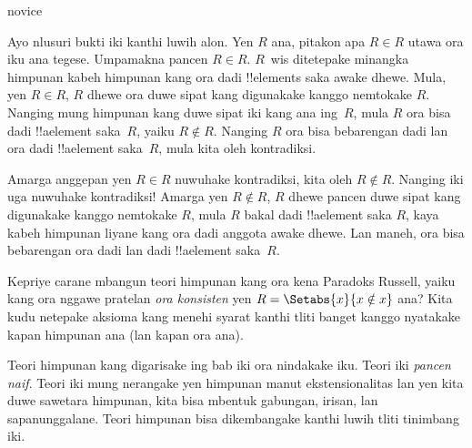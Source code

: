 \documentclass[../../../include/open-logic-section]{subfiles}
\begin{document}
\begin{tagblock}{novice}
\begin{explain}
Ayo nlusuri bukti iki kanthi luwih alon. Yen $R$ ana,
pitakon apa $R \in R$ utawa ora iku ana tegese.
Umpamakna pancen $R \in R$. $R$~wis ditetepake minangka
himpunan kabeh himpunan kang ora dadi !!{element}s saka
awake dhewe. Mula, yen $R \in R$, $R$ dhewe ora duwe
sipat kang digunakake kanggo nemtokake $R$.
Nanging mung himpunan kang duwe sipat iki kang ana ing~$R$,
mula $R$ ora bisa dadi !!a{element} saka~$R$,
yaiku $R \notin R$. Nanging $R$ ora bisa bebarengan dadi
lan ora dadi !!a{element} saka~$R$, mula kita oleh kontradiksi.

Amarga anggepan yen $R \in R$ nuwuhake kontradiksi,
kita oleh $R \notin R$. Nanging iki uga nuwuhake kontradiksi!{}
Amarga yen $R\notin R$, $R$ dhewe pancen duwe sipat kang
digunakake kanggo nemtokake $R$, mula $R$ bakal dadi
!!a{element} saka $R$, kaya kabeh himpunan liyane kang
ora dadi anggota awake dhewe.
Lan maneh, ora bisa bebarengan ora dadi lan dadi
!!a{element} saka~$R$.
\end{explain}
\end{tagblock}

\begin{digress}
Kepriye carane mbangun teori himpunan kang ora kena Paradoks
Russell, yaiku kang ora nggawe pratelan \emph{ora konsisten}
yen $R = \Setabs{x}{x \notin x}$ ana?
Kita kudu netepake aksioma kang menehi syarat kanthi tliti banget
kanggo nyatakake kapan himpunan ana (lan kapan ora ana).

Teori himpunan kang digarisake ing bab iki ora nindakake iku.
Teori iki \emph{pancen naif}. Teori iki mung nerangake yen
himpunan manut ekstensionalitas lan yen kita duwe sawetara
himpunan, kita bisa mbentuk gabungan, irisan, lan sapanunggalane.
Teori himpunan bisa dikembangake kanthi luwih tliti tinimbang iki.
\end{digress}
\end{document}

